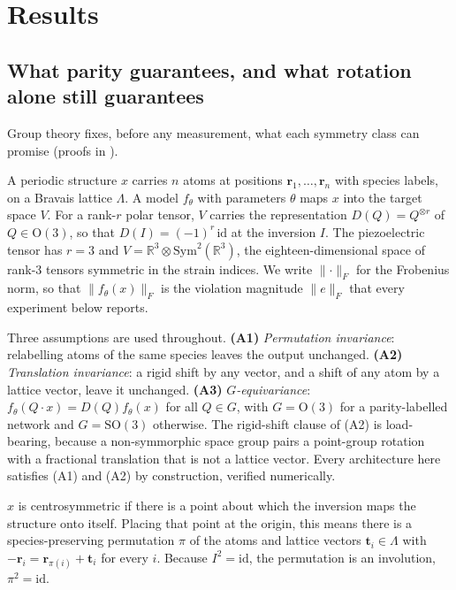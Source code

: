 \section*{Results}

\subsection*{What parity guarantees, and what rotation alone still guarantees}

Group theory fixes, before any measurement, what each symmetry class can promise (proofs in ).

A periodic structure $x$ carries $n$ atoms at positions $\mathbf{r}_1,\dots,\mathbf{r}_n$ with species labels, on a Bravais lattice $\Lambda$. A model $f_\theta$ with parameters $\theta$ maps $x$ into the target space $V$. For a rank-$r$ polar tensor, $V$ carries the representation $D(Q) = Q^{\otimes r}$ of $Q \in \mathrm{O}(3)$, so that $D(I) = (-1)^{r}\,\mathrm{id}$ at the inversion $I$. The piezoelectric tensor has $r = 3$ and $V = \mathbb{R}^{3}\otimes\mathrm{Sym}^{2}(\mathbb{R}^{3})$, the eighteen-dimensional space of rank-3 tensors symmetric in the strain indices. We write $\lVert\cdot\rVert_F$ for the Frobenius norm, so that $\lVert f_\theta(x)\rVert_F$ is the violation magnitude $\lVert e \rVert_F$ that every experiment below reports.

Three assumptions are used throughout. \textbf{(A1)} \emph{Permutation invariance}: relabelling atoms of the same species leaves the output unchanged. \textbf{(A2)} \emph{Translation invariance}: a rigid shift by any vector, and a shift of any atom by a lattice vector, leave it unchanged. \textbf{(A3)} \emph{$G$-equivariance}: $f_\theta(Q\!\cdot\!x)=D(Q)f_\theta(x)$ for all $Q\in G$, with $G=\mathrm{O}(3)$ for a parity-labelled network and $G=\mathrm{SO}(3)$ otherwise. The rigid-shift clause of (A2) is load-bearing, because a non-symmorphic space group pairs a point-group rotation with a fractional translation that is not a lattice vector. Every architecture here satisfies (A1) and (A2) by construction, verified numerically.

\begin{definition}\label{def:centro}
$x$ is centrosymmetric if there is a point about which the inversion maps the structure onto itself. Placing that point at the origin, this means there is a species-preserving permutation $\pi$ of the atoms and lattice vectors $\mathbf{t}_i \in \Lambda$ with $-\mathbf{r}_i = \mathbf{r}_{\pi(i)} + \mathbf{t}_i$ for every $i$. Because $I^2 = \mathrm{id}$, the permutation is an involution, $\pi^{2} = \mathrm{id}$.
\end{definition}

